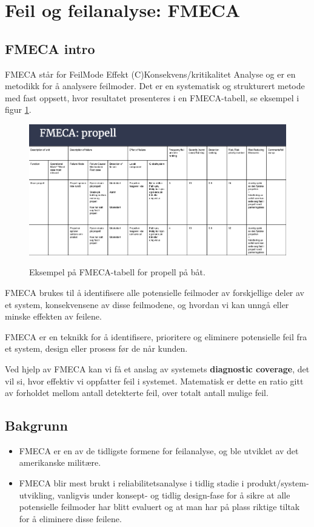 \section{Feil og feilanalyse: FMECA}
\label{sec:fmeca}


\subsection{FMECA intro}

FMECA står for FeilMode Effekt (C)Konsekvens/kritikalitet Analyse og er en metodikk for å analysere feilmoder. Det er en systematisk og strukturert metode med fast oppsett, hvor resultatet presenteres i en FMECA-tabell, se eksempel i figur \ref{fig:fmeca_propell}.

\begin{figure}[H]
    \centering
        \includegraphics[width=\textwidth]{figures/FMECA/Skjermbilde 2021-11-24 kl. 09.54.55.png}\\
        \caption{Eksempel på FMECA-tabell for propell på båt.}
        \label{fig:fmeca_propell}
\end{figure}

FMECA brukes til å identifisere alle potensielle feilmoder av forskjellige deler av et system, konsekvensene av disse feilmodene, og hvordan vi kan unngå eller minske effekten av feilene.

FMECA er en teknikk for å identifisere, prioritere og eliminere potensielle feil fra et system, design eller prosess før de når kunden.


Ved hjelp av FMECA kan vi få et anslag av systemets \textbf{diagnostic coverage}, det vil si, hvor effektiv vi oppfatter feil i systemet. Matematisk er dette en ratio gitt av forholdet mellom antall detekterte feil, over totalt antall mulige feil.


\subsection{Bakgrunn}
\begin{itemize}
    \item FMECA er en av de tidligste formene for feilanalyse, og ble utviklet av det amerikanske militære.
    \item FMECA blir mest brukt i reliabilitetsanalyse i tidlig stadie i produkt/system-utvikling, vanligvis under konsept- og tidlig design-fase for å sikre at alle potensielle feilmoder har blitt evaluert og at man har på plass riktige tiltak for å eliminere disse feilene.
\end{itemize}

